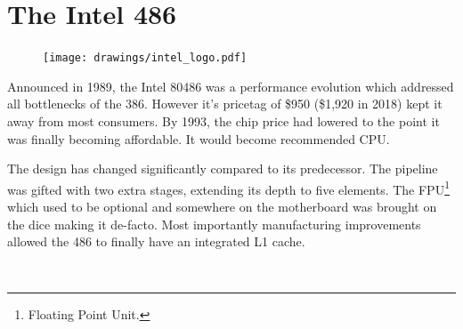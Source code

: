 \section{The Intel 486}

\begin{figure}
\centering
\texttt{[image: drawings/intel\_logo.pdf]}
\end{figure}

Announced in 1989, the Intel 80486 was a performance evolution which addressed all bottlenecks of the 386. However it's pricetag of \$950 (\$1,920 in 2018) kept it away from most consumers. By 1993, the chip price had lowered to the point it was finally becoming affordable. It would become \doom recommended CPU.\\
\par
The design has changed significantly compared to its predecessor. The pipeline was gifted with two extra stages, extending its depth to five elements. The FPU\footnote{Floating Point Unit.} which used to be optional and somewhere on the motherboard was brought on the dice making it de-facto. Most importantly manufacturing improvements allowed the 486 to finally have an integrated L1 cache.\\
\par
{}\\
\par

